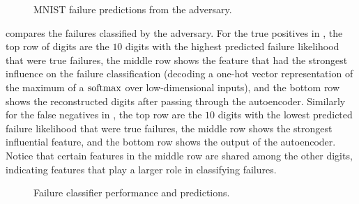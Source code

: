 \begin{figure}[ht]
    \centering
    \hspace{5mm}
    \caption{MNIST failure predictions from the adversary.}\label{fig:predictions}
\end{figure}


 compares the failures classified by the adversary.
For the true positives in , the top row of digits are the $10$ digits with the highest predicted failure likelihood that were true failures, the middle row shows the feature that had the strongest influence on the failure classification (decoding a one-hot vector representation of the maximum of a $\operatorname{softmax}$ over low-dimensional inputs), and the bottom row shows the reconstructed digits after passing through the autoencoder.
Similarly for the false negatives in , the top row are the $10$ digits with the lowest predicted failure likelihood that were true failures, the middle row shows the strongest influential feature, and the bottom row shows the output of the autoencoder. Notice that certain features in the middle row are shared among the other digits, indicating features that play a larger role in classifying failures.

\begin{figure}[ht]
    \centering
    \caption{Failure classifier performance and predictions.}
    \label{fig:prediction_results}
\end{figure}


